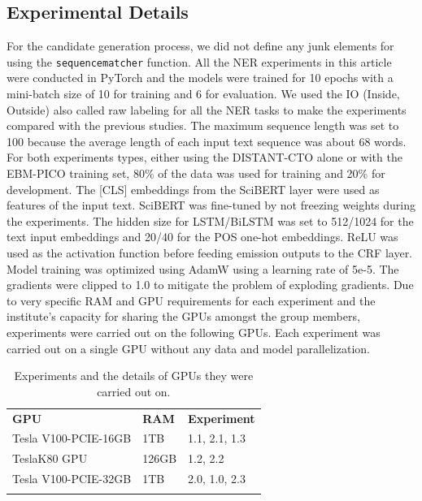 \documentclass[11pt]{article}
\begin{document}
\subsection{Experimental Details}
\label{app:expdet}
%
For the candidate generation process, we did not define any junk elements for using the {\tt sequencematcher} function.
All the NER experiments in this article were conducted in PyTorch and the models were trained for 10 epochs with a mini-batch size of 10 for training and 6 for evaluation.
We used the IO (Inside, Outside) also called raw labeling for all the NER tasks to make the experiments compared with the previous studies.
The maximum sequence length was set to 100 because the average length of each input text sequence was about 68 words.
For both experiments types, either using the DISTANT-CTO alone or with the EBM-PICO training set, 80\% of the data was used for training and 20\% for development.
The [CLS] embeddings from the SciBERT layer were used as features of the input text.
SciBERT was fine-tuned by not freezing weights during the experiments.
The hidden size for LSTM/BiLSTM was set to 512/1024 for the text input embeddings and 20/40 for the POS one-hot embeddings.
ReLU was used as the activation function before feeding emission outputs to the CRF layer.
Model training was optimized using AdamW using a learning rate of 5e-5.
The gradients were clipped to 1.0 to mitigate the problem of exploding gradients.
Due to very specific RAM and GPU requirements for each experiment and the institute's capacity for sharing the GPUs amongst the group members, experiments were carried out on the following GPUs.
Each experiment was carried out on a single GPU without any data and model parallelization.
%
%
\begin{table}[htp]
\centering
\begin{tabular}{l|l|l}
\Xhline{1pt}
\textbf{GPU} & \textbf{RAM} & \textbf{ Experiment }  \\
\Xhline{1pt}
Tesla V100-PCIE-16GB & 1TB  & 1.1, 2.1, 1.3\\
TeslaK80 GPU & 126GB & 1.2, 2.2\\
Tesla V100-PCIE-32GB & 1TB   & 2.0, 1.0, 2.3\\
\Xhline{1pt}
\end{tabular}
\caption{Experiments and the details of GPUs they were carried out on.}
\label{table:exp_gpu} 
\end{table}
%
%
%
\end{document}
